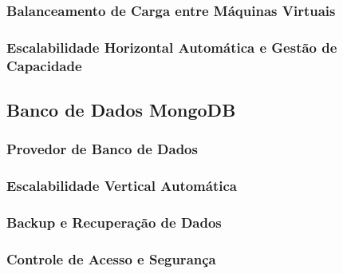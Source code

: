 \subsubsection{Balanceamento de Carga entre Máquinas Virtuais}

\subsubsection{Escalabilidade Horizontal Automática e Gestão de Capacidade}

\subsection{Banco de Dados MongoDB}

\subsubsection{Provedor de Banco de Dados}

\subsubsection{Escalabilidade Vertical Automática}

\subsubsection{Backup e Recuperação de Dados}

\subsubsection{Controle de Acesso e Segurança}

